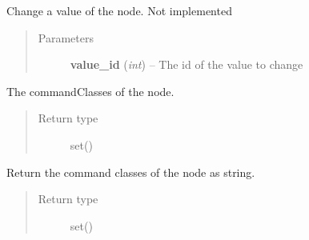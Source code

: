 \documentclass[letterpaper,10pt,english]{sphinxmanual}
\begin{document}
\begin{fulllineitems}
\begin{fulllineitems}
\begin{quote}
\begin{description}
\end{description}\end{quote}

\end{fulllineitems}


\begin{fulllineitems}
\label{node:openzwave.node.ZWaveNode.change_value}
Change a value of the node.
Not implemented
\begin{quote}\begin{description}
\item[{Parameters}] \leavevmode
\textbf{value\_id} (\emph{int}) -- The id of the value to change

\end{description}\end{quote}

\end{fulllineitems}


\begin{fulllineitems}
\label{node:openzwave.node.ZWaveNode.command_classes}
The commandClasses of the node.
\begin{quote}\begin{description}
\item[{Return type}] \leavevmode
set()

\end{description}\end{quote}

\end{fulllineitems}


\begin{fulllineitems}
\label{node:openzwave.node.ZWaveNode.command_classes_as_string}
Return the command classes of the node as string.
\begin{quote}\begin{description}
\item[{Return type}] \leavevmode
set()

\end{description}\end{quote}


\end{fulllineitems}
\end{fulllineitems}
\end{document}
